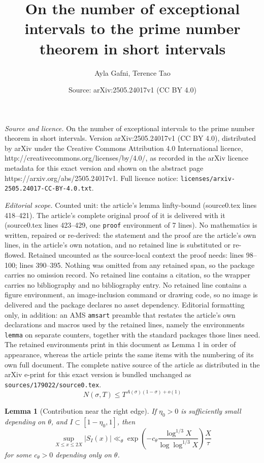 \documentclass[10pt,a4paper]{amsart}
\title{On the number of exceptional intervals to the prime number theorem in short intervals}
\author{Ayla Gafni, Terence Tao}
\date{Source: arXiv:2505.24017v1 (CC BY 4.0)}
\newtheorem{lemma}{Lemma}
\begin{document}
\maketitle

\noindent\emph{Source and licence.} On the number of exceptional intervals to the prime number theorem in short intervals. Version arXiv:2505.24017v1 (CC BY 4.0), distributed by arXiv under the Creative Commons Attribution 4.0 International licence, http://creativecommons.org/licenses/by/4.0/, as recorded in the arXiv licence metadata for this exact version and shown on the abstract page https://arxiv.org/abs/2505.24017v1. Full licence notice: \texttt{licenses/arxiv-2505.24017-CC-BY-4.0.txt}.\par\smallskip

\noindent\textit{Editorial scope.} Counted unit: the article's lemma linfty-bound (source0.tex lines 418--421). The article's complete original proof of it is delivered with it (source0.tex lines 423--429, one \texttt{proof} environment of 7 lines). No mathematics is written, repaired or re-derived: the statement and the proof are the article's own lines, in the article's own notation, and no retained line is substituted or re-flowed.  Retained uncounted as the source-local context the proof needs: lines 98--100; lines 390--395.  Nothing was omitted from any retained span, so the package carries no omission record.  No retained line contains a citation, so the wrapper carries no bibliography and no bibliography entry.  No retained line contains a figure environment, an image-inclusion command or drawing code, so no image is delivered and the package declares no asset dependency.  Editorial formatting only, in addition: an AMS \texttt{amsart} preamble that restates the article's own declarations and macros used by the retained lines, namely the environments \texttt{lemma} on separate counters, together with the standard packages those lines need.  The retained environments print in this document as Lemma 1 in order of appearance, whereas the article prints the same items with the numbering of its own full document.  The complete native source of the article as distributed in the arXiv e-print for this exact version is bundled unchanged as \texttt{sources/179022/source0.tex}.
\begin{equation}\label{nsig-up}
  N(\sigma, T) \leq T^{A(\sigma)(1-\sigma) + o(1)}
\end{equation}

\begin{lemma}[Contribution near the right edge]\label{right-edge}  If $\eta_0>0$ is sufficiently small depending on $\theta$, and $I \subset [1-\eta_0,1]$, then
  \begin{equation}\label{si-bound}
\sup_{X \leq x \leq 2X}|S_I(x)| \ll_\theta \exp\left(-c_\theta \frac{\log^{1/3} X}{\log\log^{1/3} X} \right)\frac{X}{\tau}
  \end{equation}
  for some $c_\theta>0$ depending only on $\theta$.
\end{lemma}
\end{document}
